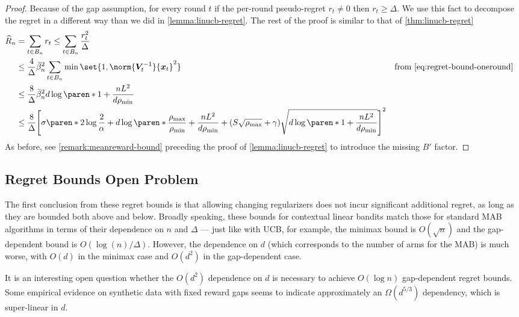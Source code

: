 \documentclass{article}
\renewcommand{\vec}[1]{\bm{#1}}
\newcommand{\inv}[1]{#1^{-1}}
\DeclarePairedDelimiter{\paren}()
\DeclarePairedDelimiter{\brck}{[}{]}
\begin{document}
\begin{proof}
  Because of the gap assumption, for every round $t$ if the per-round
  pseudo-regret $r_t \neq 0$ then $r_t \ge \Delta$.  We use this fact
  to decompose the regret in a different way than we did in
  \cref{lemma:linucb-regret}.  The rest of the proof is similar to
  that of \cref{thm:linucb-regret}
  \begin{align*}
    \widehat R_n
    &= \sum_{t\in B_n} r_t \le \sum_{t\in B_n} \frac{r_t^2}{\Delta} \\
    &\le \frac{4}{\Delta} \bar\beta_n^2 \sum_{t\in B_n} \min\set{1, \norm{\inv{\vec V_t}}{\vec x_t}^2}
    &\text{from~\eqref{eq:regret-bound-oneround}} \\
    &\le \frac{8}{\Delta} \bar\beta_n^2d\log\paren*{1+\frac{nL^2}{d\rho_{\min}}} \\
    &\le \frac{8}{\Delta} \brck*{\sigma\paren*{2\log\frac{2}{\alpha}
      + d\log\paren*{\frac{\rho_{\max}}{\rho_{\min}} + \frac{nL^2}{d\rho_{\min}}}}
      + (S\sqrt{\rho_{\max}}+\gamma)\sqrt{d\log\paren*{1+\frac{nL^2}{d\rho_{\min}}}}}^2
    &&\qedhere
  \end{align*}
  As before, see \cref{remark:meanreward-bound} preceding
  the proof of \cref{lemma:linucb-regret} to introduce
  the missing $B'$ factor.
\end{proof}

\subsection{Regret Bounds Open Problem}
\label{sec:regret-discussion}

The first conclusion from these regret bounds is that allowing
changing regularizers does not incur significant additional regret, as
long as they are bounded both above and below.  Broadly speaking,
these bounds for contextual linear bandits match those for standard
MAB algorithms in terms of their dependence on $n$ and $\Delta$ ---
just like with UCB, for example, the minimax bound is $O(\sqrt n)$ and
the gap-dependent bound is $O(\log(n)/\Delta)$.  However, the
dependence on $d$ (which corresponds to the number of arms for the
MAB) is much worse, with $O(d)$ in the minimax case and $O(d^2)$ in
the gap-dependent case.

It is an interesting open question whether the $O(d^2)$ dependence on
$d$ is necessary to achieve $O(\log n)$ gap-dependent regret bounds.
Some empirical evidence on synthetic data with fixed reward gaps seems
to indicate approximately an $\Omega(d^{5/3})$ dependency, which is
super-linear in $d$.
\end{document}
